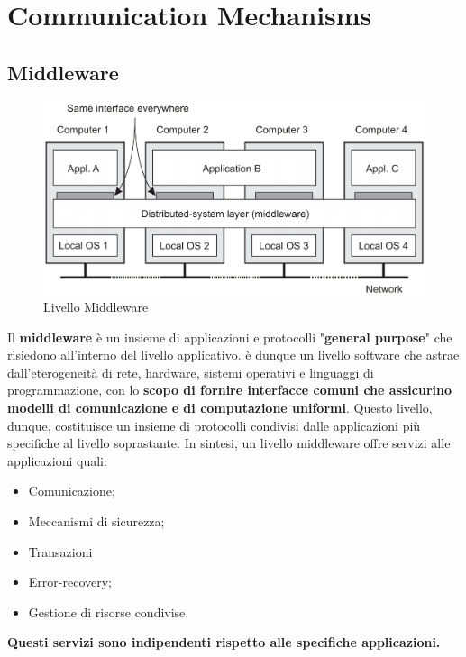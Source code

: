 \documentclass[12pt]{article}
\begin{document}
	\maketitle
	\tableofcontents
	\listoftables
	\listoffigures
	
\section{Communication Mechanisms}
	\subsection{Middleware}	
		\begin{figure}[h!]
			\centering
			\includegraphics[scale=0.50]{img/middle.png}
			\caption{Livello Middleware}
		\end{figure}
		Il \textbf{middleware} è un insieme di applicazioni e protocolli "\textbf{general purpose}" che risiedono all'interno del livello applicativo. è dunque un livello software che astrae dall'eterogeneità di rete, hardware, sistemi operativi e linguaggi di programmazione, con lo \textbf{scopo di fornire interfacce comuni che assicurino  modelli di comunicazione e di computazione uniformi}.  Questo livello, dunque, costituisce un insieme di protocolli condivisi dalle applicazioni più specifiche al livello soprastante.
		In sintesi, un livello middleware offre servizi alle applicazioni quali:
		\begin{itemize}
			\item Comunicazione;
			\item Meccanismi di sicurezza;
			\item Transazioni
			\item Error-recovery;
			\item Gestione di risorse condivise.
		\end{itemize}
		\textbf{Questi servizi sono indipendenti rispetto alle specifiche applicazioni.} 
\end{document}

